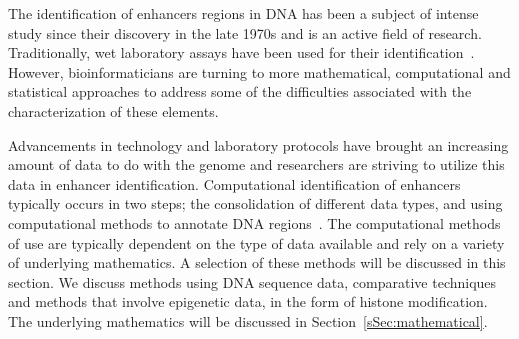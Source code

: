 
        The identification of enhancers regions in DNA has been a subject of intense study since their discovery in the late 1970s and is an active field of research. Traditionally, wet laboratory assays have been used for their identification~\cite{rosenthal198772}. However, bioinformaticians are turning to more mathematical, computational and statistical approaches to address some of the difficulties associated with the characterization of these elements. 
        
        Advancements in technology and laboratory protocols have brought an increasing amount of data to do with the genome and researchers are striving to utilize this data in enhancer identification. Computational identification of enhancers typically occurs in two steps; the consolidation of different data types, and using computational methods to annotate DNA regions~\cite{kleftogiannis2015progress}. The computational methods of use are typically dependent on the type of data available and rely on a variety of underlying mathematics. A selection of these methods will be discussed in this section. We discuss methods using DNA sequence data, comparative techniques and methods that involve epigenetic data, in the form of histone modification. The underlying mathematics will be discussed in Section~\ref{sSec:mathematical}.
        
        
        

